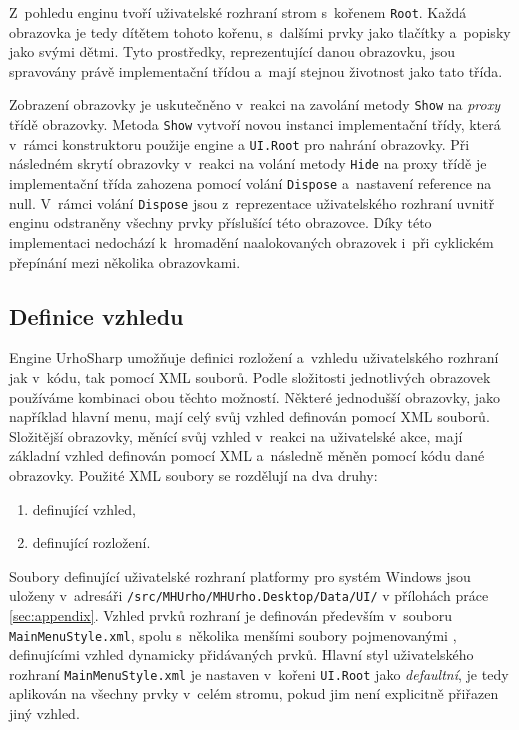 Z~pohledu enginu tvoří uživatelské rozhraní strom s~kořenem \texttt{Root}. Každá obrazovka je tedy dítětem tohoto kořenu, s~dalšími prvky jako tlačítky a~popisky jako svými dětmi. Tyto prostředky, reprezentující danou obrazovku, jsou spravovány právě implementační třídou a~mají stejnou životnost jako tato třída.

Zobrazení obrazovky je uskutečněno v~reakci na zavolání metody \texttt{Show} na \textit{proxy} třídě obrazovky. Metoda \texttt{Show} vytvoří novou instanci implementační třídy, která v~rámci konstruktoru použije engine a \texttt{UI.Root} pro nahrání obrazovky. Při následném skrytí obrazovky v~reakci na volání metody \texttt{Hide} na proxy třídě je implementační třída zahozena pomocí volání \texttt{Dispose} a~nastavení reference na null. V~rámci volání \texttt{Dispose} jsou z~reprezentace uživatelského rozhraní uvnitř enginu odstraněny všechny prvky příslušící této obrazovce. Díky této implementaci nedochází k~hromadění naalokovaných obrazovek i~při cyklickém přepínání mezi několika obrazovkami.



\subsection{Definice vzhledu}
Engine UrhoSharp umožňuje definici rozložení a~vzhledu uživatelského rozhraní jak v~kódu, tak pomocí XML souborů. Podle složitosti jednotlivých obrazovek používáme kombinaci obou těchto možností. Některé jednodušší obrazovky, jako například hlavní menu, mají celý svůj vzhled definován pomocí XML souborů. Složitější obrazovky, měnící svůj vzhled v~reakci na uživatelské akce, mají základní vzhled definován pomocí XML a~následně měněn pomocí kódu dané obrazovky. Použité XML soubory se rozdělují na dva druhy:
\begin{enumerate}
	\item definující vzhled,
	\item definující rozložení.
\end{enumerate}

Soubory definující uživatelské rozhraní platformy pro systém Windows jsou uloženy v~adresáři \texttt{/src/MHUrho/MHUrho.Desktop/Data/UI/} v přílohách práce \ref{sec:appendix}.
Vzhled prvků rozhraní je definován především v~souboru \texttt{MainMenuStyle.xml}, spolu s~několika menšími soubory pojmenovanými , definujícími vzhled dynamicky přidávaných prvků. Hlavní styl uživatelského rozhraní \texttt{MainMenuStyle.xml} je nastaven v~kořeni \texttt{UI.Root} jako \textit{defaultní}, je tedy aplikován na všechny prvky v~celém stromu, pokud jim není explicitně přiřazen jiný vzhled.

